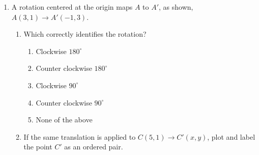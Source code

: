 \begin{enumerate}
\item A rotation centered at the origin maps $A$ to $A'$, as shown, $A(3,1) \rightarrow A'(-1,3)$.
\begin{multicols}{2}
  \begin{enumerate}
    \item Which correctly identifies the rotation?
    \begin{enumerate}[label=(\Alph*)]
      \item Clockwise $180^\circ$
      \item Counter clockwise $180^\circ$
      \item Clockwise $90^\circ$
      \item Counter clockwise $90^\circ$
      \item None of the above
    \end{enumerate} \vspace{2cm}
    \item If the same translation is applied to $C(5,1)\rightarrow C'(x,y)$, plot and label the point $C'$ as an ordered pair.
    \end{enumerate}
    \begin{flushright}
    \end{flushright}
\end{multicols}


\end{enumerate}
